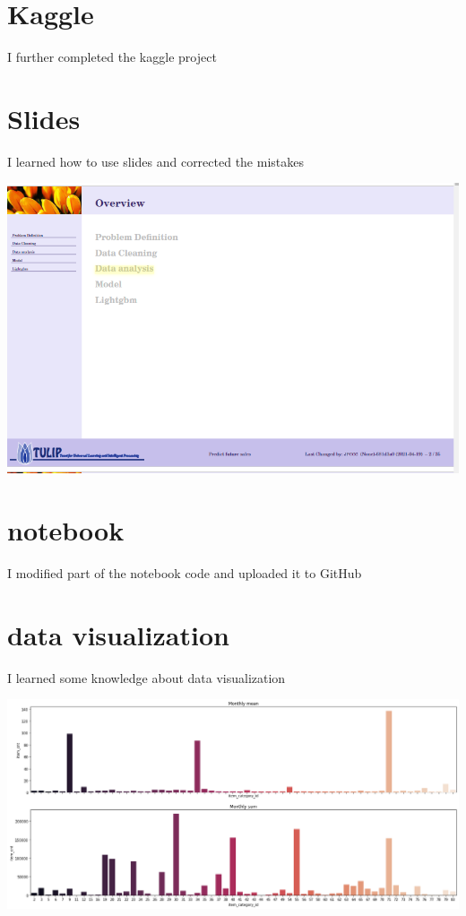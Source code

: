\section{Kaggle} \label{sec-kaggle}
I further completed the kaggle project
\section{Slides} \label{sec-slides}
    I learned how to use slides and corrected the mistakes\par
        \includegraphics[scale=0.5]{picture/report.png}
\section{notebook} \label{sec-nodebook}
I modified part of the notebook code and uploaded it to GitHub
\section{data visualization}
I learned some knowledge about data visualization\par
\includegraphics[scale=0.3]{picture/21.png}
